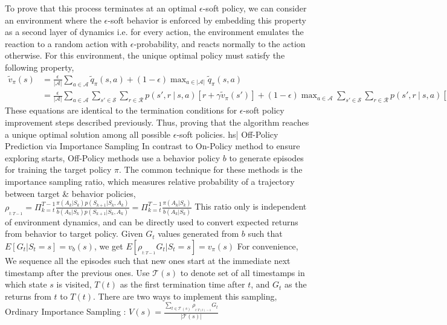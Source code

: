 To prove that this process terminates at an optimal \( \epsilon \)-soft policy, we can consider an environment where the \( \epsilon \)-soft behavior is enforced by embedding this property as a second layer of dynamics i.e. for every action, the environment emulates the reaction to a random action with \( \epsilon \)-probability, and reacts normally to the action otherwise. For this environment, the unique optimal policy must satisfy the following property,
\( \begin{aligned} \tilde{v}_\pi(s) &= \frac{\epsilon}{|\mathcal{A}|} \sum_{a \in \mathcal{A}} \tilde{q}_\pi(s, a) + (1 - \epsilon) \max_{a \in |\mathcal{A}|} \tilde{q}_\pi(s, a) \\ &= \frac{\epsilon}{|\mathcal{A}|} \sum_{a \in \mathcal{A}} \sum_{ s' \in \mathcal{S}} \sum_{r \in {\mathcal{R}}} p(s', r \ | \ s, a) [r + \gamma \tilde{v}_\pi(s')] + (1 - \epsilon) \max_{a \in \mathcal{A}} \sum_{s' \in \mathcal{S}} \sum_{r \in \mathcal{R}} p(s', r \ | \ s, a) [r + \gamma\tilde{v}_\pi(s')] \end{aligned} \)
These equations are identical to the termination conditions for \( \epsilon \)-soft policy improvement steps described previously. Thus, proving that the algorithm reaches a unique optimal solution among all possible \( \epsilon \)-soft policies.
hs| Off-Policy Prediction via Importance Sampling
In contrast to On-Policy method to ensure exploring starts, Off-Policy methods use a behavior policy \( b \) to generate episodes for training the target policy \( \pi \). The common technique for these methods is the importance sampling ratio, which measures relative probability of a trajectory between target & behavior policies,
\( \rho_{_{t:T-1}} = \Pi_{k=t}^{T-1}\frac{\pi(A_k | S_k) p(S_{k+1} | S_k, A_k)}{b(A_k | S_k) p(S_{k+1} | S_k, A_k)} = \Pi_{k=t}^{T-1} \frac{\pi(A_k | S_k)}{b(A_k | S_k)} \)
This ratio only is independent of environment dynamics, and can be directly used to convert expected returns from behavior to target policy.
Given \( G_t \) values generated from \( b \) such that \( E[G_t| S_t=s] = v_b(s) \), we get \( E[\rho_{_{t:T-1}} G_t | S_t = s] = v_\pi(s) \)
For convenience, We sequence all the episodes such that new ones start at the immediate next timestamp after the previous ones. Use \( \mathcal{T}(s) \) to denote set of all timestamps in which state \( s \) is visited, \( T(t) \) as the first termination time after \( t \), and \( G_t \) as the returns from \( t \) to \( T(t) \). There are two ways to implement this sampling,
Ordinary Importance Sampling : \( V(s) = \frac{\sum_{t \in \mathcal{T}(s)} \rho_{_{t:T(t) - 1}} G_t}{| \mathcal{T}(s) |} \)
